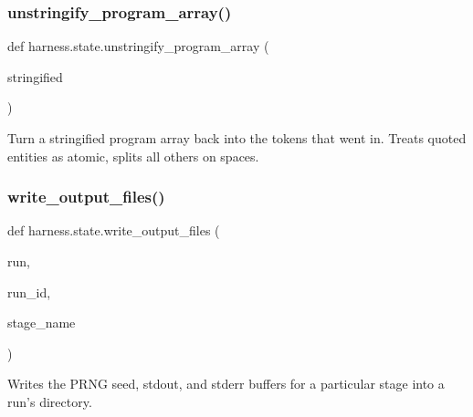\subsubsection{\texorpdfstring{unstringify\+\_\+program\+\_\+array()}{unstringify\_program\_array()}}
{\footnotesize\ttfamily def harness.\+state.\+unstringify\+\_\+program\+\_\+array (\begin{DoxyParamCaption}\item[{}]{stringified }\end{DoxyParamCaption})}

\begin{DoxyVerb}Turn a stringified program array back into the tokens that went in.
Treats quoted entities as atomic,
splits all others on spaces.
\end{DoxyVerb}
 \mbox{\label{namespaceharness_1_1state_ae75ae7a901905049c347e74b10ecfbc7}} 
\subsubsection{\texorpdfstring{write\+\_\+output\+\_\+files()}{write\_output\_files()}}
{\footnotesize\ttfamily def harness.\+state.\+write\+\_\+output\+\_\+files (\begin{DoxyParamCaption}\item[{}]{run,  }\item[{}]{run\+\_\+id,  }\item[{}]{stage\+\_\+name }\end{DoxyParamCaption})}

\begin{DoxyVerb}Writes the PRNG seed, stdout, and stderr buffers for a particular stage
into a run's directory.
\end{DoxyVerb}
 